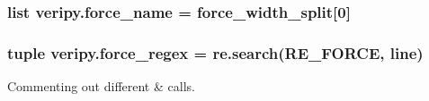 \hypertarget{namespaceveripy_a562ab1159e6bb9e14c42054833922dba}{
\subsubsection[{force\-\_\-name}]{\setlength{\rightskip}{0pt plus 5cm}list veripy.\-force\-\_\-name = {\bf force\-\_\-width\-\_\-split}\mbox{[}0\mbox{]}}}\label{namespaceveripy_a562ab1159e6bb9e14c42054833922dba}
\hypertarget{namespaceveripy_af5876ef12bb1a85e8d8cd34cfafe054c}{
\subsubsection[{force\-\_\-regex}]{\setlength{\rightskip}{0pt plus 5cm}tuple veripy.\-force\-\_\-regex = re.\-search(R\-E\-\_\-\-F\-O\-R\-C\-E, {\bf line})}}\label{namespaceveripy_af5876ef12bb1a85e8d8cd34cfafe054c}


Commenting out different \& calls. 

